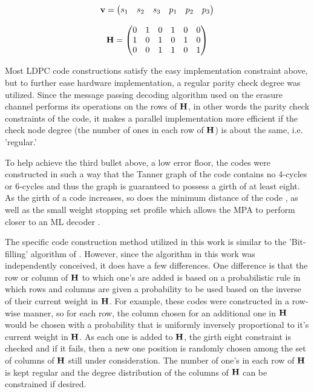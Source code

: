 \documentclass[conference]{IEEEtran}
\begin{document}
\begin{equation}
	\bf{v} = 
	\begin{pmatrix}
		s_1&s_2&s_3&p_1&p_2&p_3
	\end{pmatrix}
	\label{eq:codeword_example}
\end{equation}


\begin{equation}
	\bf{H} = 
	\begin{pmatrix}
		0&1&0&1&0&0 \\
		1&0&1&0&1&0 \\
		0&0&1&1&0&1
	\end{pmatrix}
\label{eq:LDPC_matrix_example}
\end{equation}

Most LDPC code constructions satisfy the easy implementation constraint above, but to further ease hardware implementation, a regular parity check degree was utilized.  Since the message passing decoding algorithm used on the erasure channel performs its operations on the rows of $\bf{H}$, in other words the parity check constraints of the code, it makes a parallel implementation more efficient if the check node degree (the number of ones in each row of $\bf{H}$) is about the same, i.e. 'regular.'


To help achieve the third bullet above, a low error floor, the codes were constructed in such a way that the Tanner graph \cite{tanner-81} of the code contains no 4-cycles or 6-cycles and thus the graph is guaranteed to possess a girth of at least eight.  As the girth of a code increases, so does the minimum distance of the code \cite{tanner-01}, as well as the small weight stopping set profile which allows the MPA to perform closer to an ML decoder \cite{Gallager}.

The specific code construction method utilized in this work is similar to the 'Bit-filling' algorithm of \cite{Campello-01}.  However, since the algorithm in this work was independently conceived, it does have a few differences.  One difference is that the row or column of $\bf{H}$ to which one's are added is based on a probabilistic rule in which rows and columns are given a probability to be used based on the inverse of their current weight in $\bf{H}$.  For example, these codes were constructed in a row-wise manner, so for each row, the column chosen for an additional one in $\bf{H}$ would be chosen with a probability that is uniformly inversely proportional to it's current weight in $\bf{H}$.  As each one is added to $\bf{H}$, the girth eight constraint is checked and if it fails, then a new one position is randomly chosen among the set of columns of $\bf{H}$ still under consideration.  The number of one's in each row of $\bf{H}$ is kept regular and the degree distribution of the columns of $\bf{H}$ can be constrained if desired.
\end{document}

